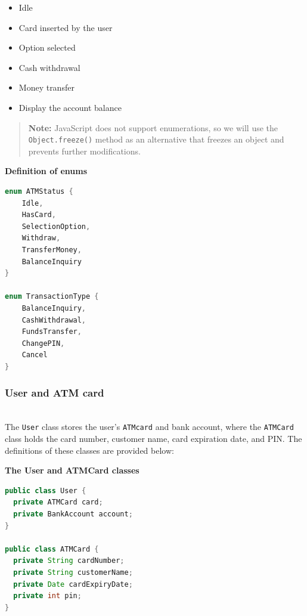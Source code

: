 \begin{itemize}
\item
\protect{}\label{mGkjYgIUsDj2CPfH5G-wL}
Idle
\item
\protect{}\label{yA7mtfeJWRPrbbCta4Xhy}
Card inserted by the user
\item
\protect{}\label{QIHN9QwxKbDprGVz91d_J}
Option selected
\item
\protect{}\label{O9AxU5sYYIb8qw1lEzEZq}
Cash withdrawal
\item
\protect{}\label{h7lIwWh1arTGdGptoXO31}
Money transfer
\item
\protect{}\label{cAytsiHjCXRWvfbtQOo5G}
Display the account balance
\end{itemize}
\begin{quote}
\textbf{Note:} JavaScript does not support enumerations, so we will use the \texttt{Object.freeze()} method as an alternative that freezes an object and prevents further modifications.
\end{quote}

\textbf{Definition of enums}

\begin{lstlisting}[language=Java]
enum ATMStatus {
    Idle,
    HasCard,
    SelectionOption,
    Withdraw,
    TransferMoney,
    BalanceInquiry
}

enum TransactionType {
    BalanceInquiry,
    CashWithdrawal,
    FundsTransfer,
    ChangePIN,
    Cancel
}
\end{lstlisting}

\subsubsection{User and ATM card}\label{mn3zfNeJYir-RBT9xIj9B}
\\
The \texttt{User} class stores the user's \texttt{ATMcard} and bank account, where the \texttt{ATMCard} class holds the card number, customer name, card expiration date, and PIN. The definitions of these classes are provided below:

\textbf{The User and ATMCard classes}

\begin{lstlisting}[language=Java]
public class User {
  private ATMCard card;
  private BankAccount account;
}

public class ATMCard {
  private String cardNumber;
  private String customerName;
  private Date cardExpiryDate;
  private int pin;
}
\end{lstlisting}

